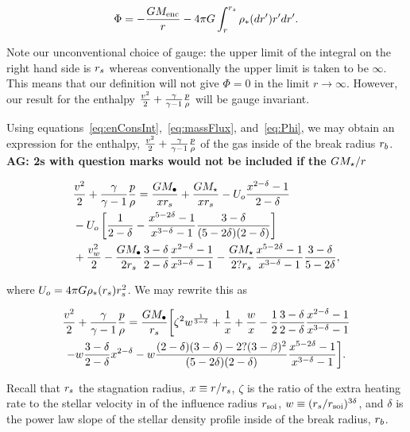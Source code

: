 \begin{align}
\Phi= -\frac{G M_{\rm enc}}{r} - 4 \pi G \int_{r}^{r_s} \rho_*(dr') r'
dr'.
\label{eq:Phi}
\end{align}

Note our unconventional choice of gauge: the upper limit of the
integral on the right hand side is $r_s$ whereas conventionally the
upper limit is taken to be $\infty$. This means that our definition
will not give $\Phi=0$ in the limit $r\rightarrow\infty$. However,
our result for the enthalpy $\frac{v^2}{2} + \frac{\gamma}{\gamma-1} \frac{p}{\rho}$ will be
gauge invariant. 

Using equations~\eqref{eq:enConsInt},~\eqref{eq:massFlux},
and~\eqref{eq:Phi}, we may obtain an expression for the enthalpy,
$\frac{v^2}{2}+\frac{\gamma}{\gamma-1} \frac{p}{\rho}$ of the gas inside of the break radius
$r_b$. {\bf AG: 2s with question marks would not be included if the $G
M_{\star}/r$ }

\begin{align}
&\frac{v^2}{2}+\frac{\gamma}{\gamma-1} \frac{p}{\rho} = \frac{G M_{\bullet}}{x r_s} + \frac{G
  M_\star}{x r_s} - U_o \frac{x^{2-\delta}-1}{2-\delta}\nonumber\\
&-U_o\left[\frac{1}{2-\delta}-\frac{x^{5-2\delta}-1}{x^{3-\delta}-1}\frac{3-\delta}{(5-2\delta)(2-\delta)}\right]\nonumber\\
&+\frac{v_w^2}{2}-\frac{G M_{\bullet}}{2 r_s} \frac{3-\delta}{2-\delta}\frac{x^{2-\delta}-1}{x^{3-\delta}-1} -\frac{G M_\star}{2? r_s} \frac{x^{5-2\delta}-1}{x^{3-\delta}-1}\frac{3-\delta}{5-2\delta},
\end{align}

where $U_o=4 \pi G \rho_*(r_s) r_s^2$.  We may rewrite this as 

\begin{multline}
  \frac{v^2}{2}+\frac{\gamma}{\gamma-1} \frac{p}{\rho}
=\frac{G M_{\bullet}}{r_s} 
\biggl[
  \zeta^2 w^{\frac{1}{3 -\delta}}+\frac{1}{x}+\frac{w}{x}
  -\frac{1}{2} \frac{3-\delta}{2-\delta} \frac{x^{2  -\delta}-1}{x^{3-\delta}-1}\\
  -w \frac{3 -\delta}{2 -\delta} x^{2 -\delta}
  -w \frac{(2-\delta)(3-\delta)-2?(3-\beta)^{2}}{(5-2\delta)(2-\delta)} \frac{x^{5-2\delta}-1}{x^{3-\delta}-1}
\biggr].
\label{eq:enthAnal}
\end{multline}

Recall that $r_s$ the stagnation radius, $x\equiv r/r_s$, $\zeta$ is
the ratio of the extra heating rate to the stellar velocity in of the
influence radius $r_{\rm soi}$, $w\equiv (r_s/r_{\rm soi})^{3\delta}$, and
$\delta$ is the power law slope of the stellar density profile inside
of the break radius, $r_b$.

